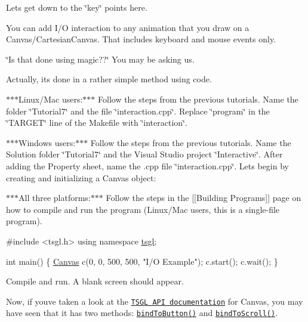 Let\textquotesingle{}s get down to the \char`\"{}key\char`\"{} points here.

You can add I/\+O interaction to any animation that you draw on a Canvas/\+Cartesian\+Canvas. That includes keyboard and mouse events only.

\char`\"{}\+Is that done using magic??\char`\"{} You may be asking us.

Actually, it\textquotesingle{}s done in a rather simple method using code.

$\ast$$\ast$$\ast$\+Linux/\+Mac users\+:$\ast$$\ast$$\ast$ Follow the steps from the previous tutorials. Name the folder \char`\"{}\+Tutorial7\char`\"{} and the file \char`\"{}interaction.\+cpp\char`\"{}. Replace \char`\"{}program\char`\"{} in the \char`\"{}\+T\+A\+R\+G\+E\+T\char`\"{} line of the Makefile with \char`\"{}interaction\char`\"{}.

$\ast$$\ast$$\ast$\+Windows users\+:$\ast$$\ast$$\ast$ Follow the steps from the previous tutorials. Name the Solution folder \char`\"{}\+Tutorial7\char`\"{} and the Visual Studio project \char`\"{}\+Interactive\char`\"{}. After adding the Property sheet, name the .cpp file \char`\"{}interaction.\+cpp\char`\"{}. Let\textquotesingle{}s begin by creating and initializing a Canvas object\+:

$\ast$$\ast$$\ast$\+All three platforms\+:$\ast$$\ast$$\ast$ Follow the steps in the \mbox{[}\mbox{[}Building Programs\mbox{]}\mbox{]} page on how to compile and run the program (Linux/\+Mac users, this is a single-\/file program).


\begin{DoxyCode}
\textcolor{preprocessor}{#include <tsgl.h>}
\textcolor{keyword}{using namespace }\hyperlink{namespacetsgl}{tsgl};

\textcolor{keywordtype}{int} main() \{
  \hyperlink{classtsgl_1_1_canvas}{Canvas} c(0, 0, 500, 500, \textcolor{stringliteral}{"I/O Example"});
  c.start();
  c.wait();
\}
\end{DoxyCode}


Compile and run. A blank screen should appear.

Now, if you\textquotesingle{}ve taken a look at the \href{http://calvin-cs.github.io/TSGL/html/index.html}{\tt T\+S\+G\+L A\+P\+I documentation} for Canvas, you may have seen that it has two methods\+: \href{http://calvin-cs.github.io/TSGL/html/classtsgl_1_1_canvas.html#a26f2f1acf2b80eee95e42bc13dbc7600}{\tt bind\+To\+Button()} and \href{http://calvin-cs.github.io/TSGL/html/classtsgl_1_1_canvas.html#aecd3d94790d2e660db380a5e951ae394}{\tt bind\+To\+Scroll()}.

